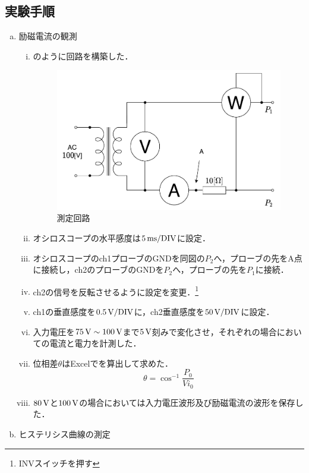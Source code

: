 \subsection{実験手順}
\begin{enumerate}[(a)]
	\item 励磁電流の観測
	\begin{enumerate}[i)]
	\item {}のように回路を構築した．
	\begin{figure}[h]
	\centering
	\includegraphics[scale=1]{./fig/circ.pdf}
	\caption{測定回路}
	\label{fig:circ}
	\end{figure}
	\item オシロスコープの水平感度は$5\,\rm{ms/DIV}$に設定．
	\item オシロスコープのch1プローブのGNDを同図の$P_{2}$へ，プローブの先をA点に接続し，ch2のプローブのGNDを$P_{2}$へ，プローブの先を$P_{1}$に接続．
	\item ch2の信号を反転させるように設定を変更．\footnote{INVスイッチを押す}
	\item ch1の垂直感度を$0.5\,\rm{V/DIV}$に，ch2垂直感度を$50\,\rm{V/DIV}$に設定．
	\item 入力電圧を$75\,\rm{V}\sim 100\,\rm{V}$まで$5\,\rm{V}$刻みで変化させ，それぞれの場合においての電流と電力を計測した．
	\item 位相差$\theta$はExcelでを算出して求めた．
	\begin{equation}
		\theta=\cos^{-1}\frac{P_{0}}{Vi_{0}}
		\label{eq:siki}
	\end{equation}
	\item $80\,\rm{V}$と$100\,\rm{V}$の場合においては入力電圧波形及び励磁電流の波形を保存した．
\end{enumerate}
\item ヒステリシス曲線の測定

\end{enumerate}
